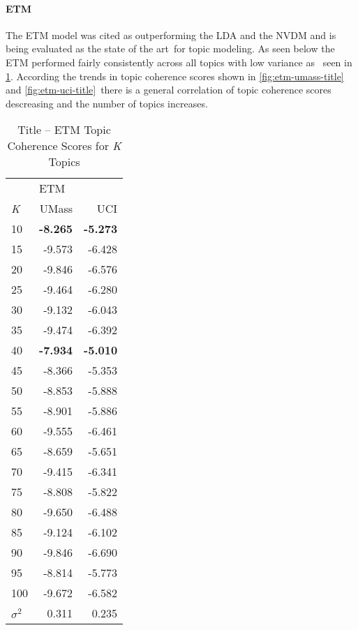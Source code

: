 \documentclass[letterpaper,12pt]{article}
\begin{document}
\paragraph{ETM}
The ETM model was cited as outperforming the LDA and the NVDM and is being evaluated as the state of the art\
for topic modeling. As seen below the ETM performed fairly consistently across all topics with low variance as \
seen in \ref{tab:etm_title_tc}. According the trends in topic coherence scores shown in \ref{fig:etm-umass-title} and \ref{fig:etm-uci-title}\
there is a general correlation of topic coherence scores descreasing and the number of topics increases.
\begin{table}
	\caption{\label{tab:etm_title_tc} Title -- ETM Topic Coherence Scores for \emph{K} Topics}
	\begin{center}
		\begin{tabular}{lrr}
			\toprule
			{} & \multicolumn{2}{l}{ETM} \\
			\emph{K} &  UMass &    UCI \\
			\midrule
			10  & \textbf{-8.265} & \textbf{-5.273} \\
			15  & -9.573 & -6.428 \\
			20  & -9.846 & -6.576 \\
			25  & -9.464 & -6.280 \\
			30  & -9.132 & -6.043 \\
			35  & -9.474 & -6.392 \\
			40  & \textbf{-7.934} & \textbf{-5.010} \\
			45  & -8.366 & -5.353 \\
			50  & -8.853 & -5.888 \\
			55  & -8.901 & -5.886 \\
			60  & -9.555 & -6.461 \\
			65  & -8.659 & -5.651 \\
			70  & -9.415 & -6.341 \\
			75  & -8.808 & -5.822 \\
			80  & -9.650 & -6.488 \\
			85  & -9.124 & -6.102 \\
			90  & -9.846 & -6.690 \\
			95  & -8.814 & -5.773 \\
			100 & -9.672 & -6.582 \\
			\midrule
			$\sigma^2$ & 0.311 & 0.235 \\
			\bottomrule
			\end{tabular}
	\end{center}
\end{table}
\end{document}
